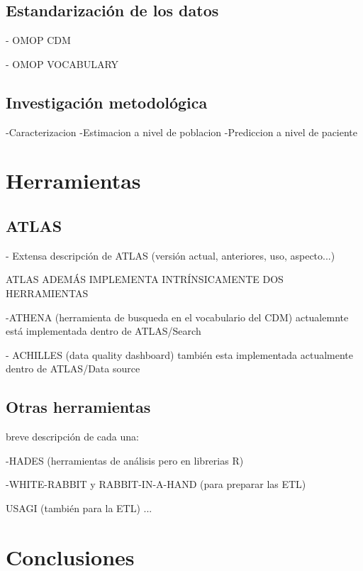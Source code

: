 \subsection{Estandarización de los datos}

- OMOP CDM

- OMOP VOCABULARY

\subsection{Investigación metodológica}
-Caracterizacion
-Estimacion a nivel de poblacion
-Prediccion a nivel de paciente

\section{Herramientas}
\subsection{ATLAS}

- Extensa descripción de ATLAS (versión actual, anteriores, uso, aspecto...)

ATLAS ADEMÁS IMPLEMENTA INTRÍNSICAMENTE  DOS HERRAMIENTAS

-ATHENA (herramienta de busqueda en el vocabulario del CDM) actualemnte está implementada dentro de ATLAS/Search

- ACHILLES (data quality dashboard) también esta implementada actualmente dentro de ATLAS/Data source


\subsection{Otras herramientas}

breve descripción de cada una:

-HADES (herramientas de análisis pero en librerias R)

-WHITE-RABBIT y RABBIT-IN-A-HAND (para preparar las ETL)

USAGI (también para la ETL)
...

\section{Conclusiones}